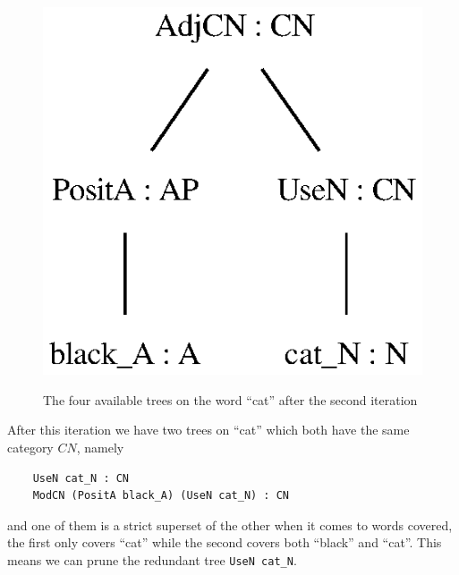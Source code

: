 \begin{figure}[H]
        {\includegraphics[scale=0.75]{thesis/figure/black_cats/black_cat_CN_gf.eps}}
    \caption{The four available trees on the word ``cat'' after the second iteration}\label{fig:cat iter 2}
\end{figure}

After this iteration we have two trees on ``cat'' which both have the same category $CN$, namely
\begin{lstlisting}
    UseN cat_N : CN
    ModCN (PositA black_A) (UseN cat_N) : CN
\end{lstlisting}
and one of them is a strict superset of the other when it comes to words covered, the first only covers ``cat'' while the second covers both ``black'' and ``cat''. This means we can prune the redundant tree \lstinline{UseN cat_N}.


